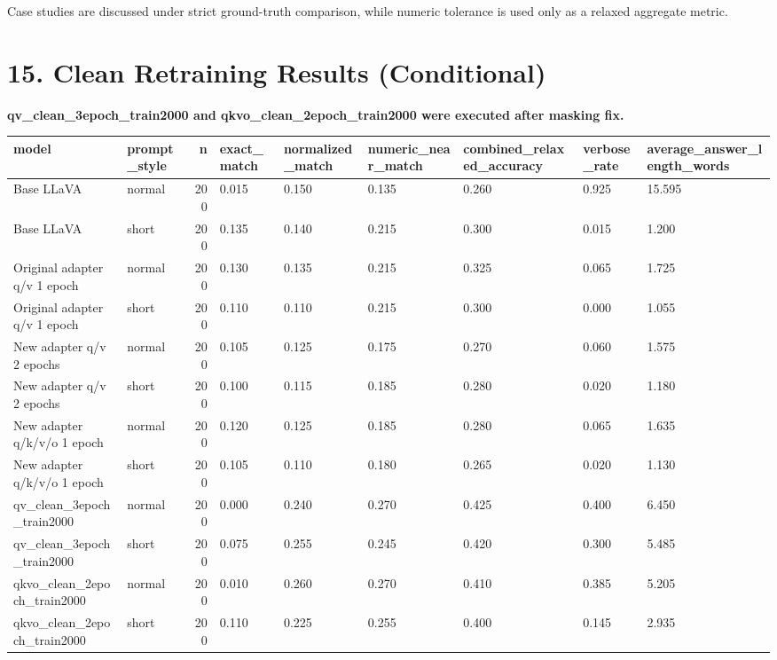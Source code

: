 \documentclass[11pt]{article}
\begin{document}
Case studies are discussed under strict ground-truth comparison, while numeric tolerance is used only as a relaxed aggregate metric.

\section*{15. Clean Retraining Results (Conditional)}
\textbf{qv\_clean\_3epoch\_train2000 and qkvo\_clean\_2epoch\_train2000 were executed after masking fix.}\
\begin{tabular}{llrllllll}
\toprule
model & prompt\_style & n & exact\_match & normalized\_match & numeric\_near\_match & combined\_relaxed\_accuracy & verbose\_rate & average\_answer\_length\_words \\
\midrule
Base LLaVA & normal & 200 & 0.015 & 0.150 & 0.135 & 0.260 & 0.925 & 15.595 \\
Base LLaVA & short & 200 & 0.135 & 0.140 & 0.215 & 0.300 & 0.015 & 1.200 \\
Original adapter q/v 1 epoch & normal & 200 & 0.130 & 0.135 & 0.215 & 0.325 & 0.065 & 1.725 \\
Original adapter q/v 1 epoch & short & 200 & 0.110 & 0.110 & 0.215 & 0.300 & 0.000 & 1.055 \\
New adapter q/v 2 epochs & normal & 200 & 0.105 & 0.125 & 0.175 & 0.270 & 0.060 & 1.575 \\
New adapter q/v 2 epochs & short & 200 & 0.100 & 0.115 & 0.185 & 0.280 & 0.020 & 1.180 \\
New adapter q/k/v/o 1 epoch & normal & 200 & 0.120 & 0.125 & 0.185 & 0.280 & 0.065 & 1.635 \\
New adapter q/k/v/o 1 epoch & short & 200 & 0.105 & 0.110 & 0.180 & 0.265 & 0.020 & 1.130 \\
qv\_clean\_3epoch\_train2000 & normal & 200 & 0.000 & 0.240 & 0.270 & 0.425 & 0.400 & 6.450 \\
qv\_clean\_3epoch\_train2000 & short & 200 & 0.075 & 0.255 & 0.245 & 0.420 & 0.300 & 5.485 \\
qkvo\_clean\_2epoch\_train2000 & normal & 200 & 0.010 & 0.260 & 0.270 & 0.410 & 0.385 & 5.205 \\
qkvo\_clean\_2epoch\_train2000 & short & 200 & 0.110 & 0.225 & 0.255 & 0.400 & 0.145 & 2.935 \\
\bottomrule
\end{tabular}
\end{document}
